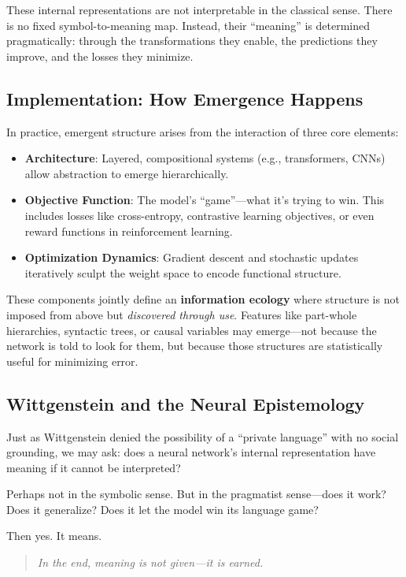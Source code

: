 These internal representations are not interpretable in the classical sense. There is no fixed symbol-to-meaning map. Instead, their ``meaning'' is determined pragmatically: through the transformations they enable, the predictions they improve, and the losses they minimize.

\subsection{Implementation: How Emergence Happens}

In practice, emergent structure arises from the interaction of three core elements:

\begin{itemize}
    \item \textbf{Architecture}: Layered, compositional systems (e.g., transformers, CNNs) allow abstraction to emerge hierarchically.
    \item \textbf{Objective Function}: The model’s ``game''—what it’s trying to win. This includes losses like cross-entropy, contrastive learning objectives, or even reward functions in reinforcement learning.
    \item \textbf{Optimization Dynamics}: Gradient descent and stochastic updates iteratively sculpt the weight space to encode functional structure.
\end{itemize}

These components jointly define an \textbf{information ecology} where structure is not imposed from above but \emph{discovered through use}. Features like part-whole hierarchies, syntactic trees, or causal variables may emerge—not because the network is told to look for them, but because those structures are statistically useful for minimizing error.

\subsection{Wittgenstein and the Neural Epistemology}

Just as Wittgenstein denied the possibility of a ``private language'' with no social grounding, we may ask: does a neural network's internal representation have meaning if it cannot be interpreted?

Perhaps not in the symbolic sense. But in the pragmatist sense—does it work? Does it generalize? Does it let the model win its language game?

Then yes. It means.

\vspace{0.5em}
\begin{quote}
    \emph{In the end, meaning is not given—it is earned.}
\end{quote}
